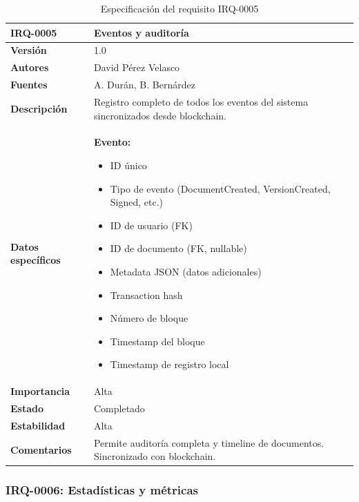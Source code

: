 \documentclass[11pt, a4paper]{article}
\begin{document}
\begin{table}[H]
    \centering
    \small
    \begin{tabular}{|p{4cm}|p{10cm}|}
    \hline
    \textbf{IRQ-0005} & Eventos y auditoría \\
    \hline
    \textbf{Versión} & 1.0 \\
    \hline
    \textbf{Autores} & David Pérez Velasco \\
    \hline
    \textbf{Fuentes} & A. Durán, B. Bernárdez \\
    \hline
    \textbf{Descripción} & Registro completo de todos los eventos del sistema sincronizados desde blockchain. \\
    \hline
    \textbf{Datos específicos} & 
    \textbf{Evento:}
    \begin{itemize}
        \item ID único
        \item Tipo de evento (DocumentCreated, VersionCreated, Signed, etc.)
        \item ID de usuario (FK)
        \item ID de documento (FK, nullable)
        \item Metadata JSON (datos adicionales)
        \item Transaction hash
        \item Número de bloque
        \item Timestamp del bloque
        \item Timestamp de registro local
    \end{itemize} \\
    \hline
    \textbf{Importancia} & Alta \\
    \hline
    \textbf{Estado} & Completado \\
    \hline
    \textbf{Estabilidad} & Alta \\
    \hline
    \textbf{Comentarios} & Permite auditoría completa y timeline de documentos. Sincronizado con blockchain. \\
    \hline
    \end{tabular}
    \caption{Especificación del requisito IRQ-0005}
\end{table}

\subsubsection{IRQ-0006: Estadísticas y métricas}
\end{document}
